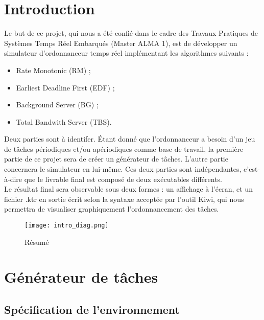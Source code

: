 \chapter*{Introduction}
	Le but de ce projet, qui nous a été confié dans le cadre des Travaux Pratiques de Systèmes Temps Réel Embarqués (Master ALMA 1), est de développer un simulateur d'ordonnanceur temps réel implémentant les algorithmes suivants :
	\begin{itemize}
		\item Rate Monotonic (RM) ;
		\item Earliest Deadline First (EDF) ;
		\item Background Server (BG) ;
		\item Total Bandwith Server (TBS).
	\end{itemize}
	
	Deux parties sont à identifer. Étant donné que l'ordonnanceur a besoin d'un jeu de tâches périodiques et/ou apériodiques comme base de travail, la première partie de ce projet sera de créer un générateur de tâches. L'autre partie concernera le simulateur en lui-même. Ces deux parties sont indépendantes, c'est-à-dire que le livrable final est composé de deux exécutables différents.\\
	
	Le résultat final sera observable sous deux formes : un affichage à l'écran, et un fichier .ktr en sortie écrit selon la syntaxe acceptée par l'outil Kiwi, qui nous permettra de visualiser graphiquement l'ordonnancement des tâches.
	
			\begin{figure}
				\centering
				\texttt{[image: intro\_diag.png]}
				\caption{Résumé}
			\end{figure}
			\FloatBarrier

\chapter{Générateur de tâches}
	\label{chap:1}
	
	\section{Spécification de l’environnement}
	
